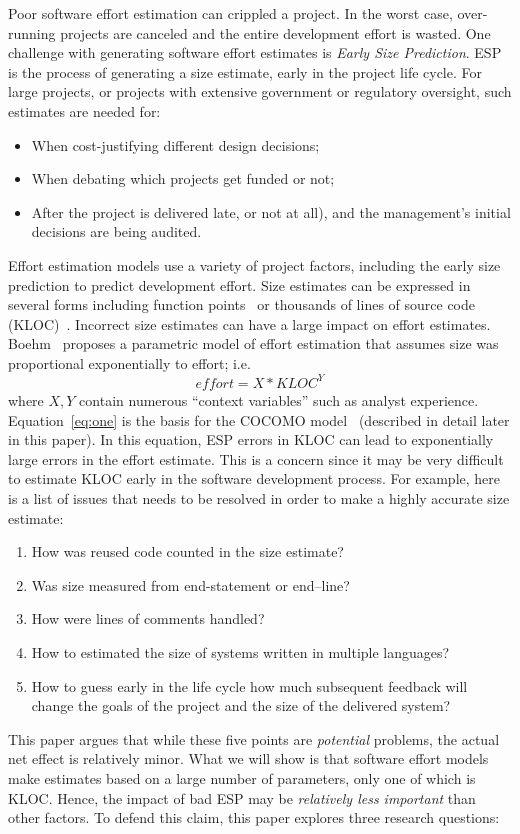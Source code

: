 \documentclass[final,twocolumn]{elsarticle}
\newcommand{\bi}{\begin{itemize}[leftmargin=0.4cm]}
\newcommand{\ei}{\end{itemize}}
\newcommand{\be}{\begin{enumerate}}
\newcommand{\ee}{\end{enumerate}}
\newcommand{\eq}[1]{Equation~\ref{eq:#1}}
\theoremstyle{break}
\begin{document}
Poor software effort estimation can crippled a project.
In
the worst case, over-running projects are canceled and
the entire development effort is wasted.
One challenge with generating software effort estimates
is  {\em Early Size Prediction}. ESP is the process of generating a size
estimate, early in the project life cycle. For large projects, or projects
with extensive government or regulatory oversight, such estimates are needed for:
\bi
\item When cost-justifying different design decisions; 
\item When debating which projects get funded or not;
\item After the project is delivered late, or not at all), and the management's
  initial decisions are being audited.
\ei
Effort estimation models use a variety of project factors, including the early size prediction
to predict development effort.
Size estimates can be expressed in several
forms including function points~\cite{Albrecht83} or  thousands of lines of
source code (KLOC)~\cite{boehm81}.
Incorrect size estimates can have a large impact on effort estimates. 
Boehm~\cite{boehm81} proposes a parametric model of effort estimation that
  assumes size was proportional exponentially to effort; i.e.
  \begin{equation}\label{eq:one}
    \mathit{effort} = \mathit{X*KLOC}^Y
    \end{equation}
  where $X,Y$ contain numerous ``context variables'' such as analyst experience.
  \eq{one} is the basis for the COCOMO model~\cite{boehm81,boehm00b}  (described in detail later in this paper).
  In this equation, ESP errors in KLOC can lead to exponentially large errors
  in the  effort estimate.
  This is a concern since it may be very difficult to estimate KLOC
  early in the software development process.
  For example, here is a list of issues that needs to be resolved in order
  to make a highly accurate size estimate:
  \be
\item How was reused code counted in the size estimate?
\item  Was size measured from end-statement or end--line?
\item How were lines of comments handled?
\item How to estimated the size of systems written in multiple languages?
\item
  How to guess early in the life cycle
  how much subsequent  feedback will change
  the goals of the project and the size of the delivered system?
  \ee
  This paper argues that while these five
  points are {\em potential} problems, the actual
  net effect is relatively minor.
What we will show is that software effort models make estimates based on a large number of parameters, only one 
of which is KLOC. 
Hence, the impact of bad ESP  may be 
{\em relatively less important} than other factors.
To defend this claim, this paper explores three research questions:
\end{document}
